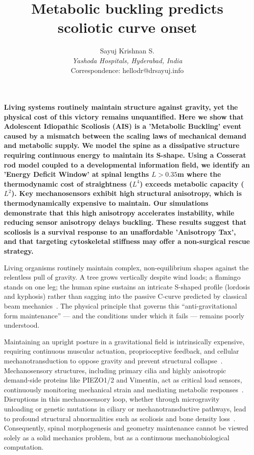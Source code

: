 \documentclass[11pt]{article}
\title{Metabolic buckling predicts scoliotic curve onset}
\author{Sayuj Krishnan S. \\
\textit{Yashoda Hospitals, Hyderabad, India} \\
Correspondence: hellodr@drsayuj.info}
\date{}
\begin{document}
\linenumbers
\maketitle

\textbf{Living systems routinely maintain structure against gravity, yet the physical cost of this victory remains unquantified. Here we show that Adolescent Idiopathic Scoliosis (AIS) is a 'Metabolic Buckling' event caused by a mismatch between the scaling laws of mechanical demand and metabolic supply. We model the spine as a dissipative structure requiring continuous energy to maintain its S-shape. Using a Cosserat rod model coupled to a developmental information field, we identify an 'Energy Deficit Window' at spinal lengths $L > 0.35$m where the thermodynamic cost of straightness ($L^4$) exceeds metabolic capacity ($L^2$). Key mechanosensors exhibit high structural anisotropy, which is thermodynamically expensive to maintain. Our simulations demonstrate that this high anisotropy accelerates instability, while reducing sensor anisotropy delays buckling. These results suggest that scoliosis is a survival response to an unaffordable 'Anisotropy Tax', and that targeting cytoskeletal stiffness may offer a non-surgical rescue strategy.}

\vspace{1em}

Living organisms routinely maintain complex, non-equilibrium shapes against the relentless pull of gravity. A tree grows vertically despite wind loads; a flamingo stands on one leg; the human spine sustains an intricate S-shaped profile (lordosis and kyphosis) rather than sagging into the passive C-curve predicted by classical beam mechanics~\cite{thompson1917growth, goriely2017mathematics, niklas1994plant}. The physical principle that governs this ``anti-gravitational form maintenance'' --- and the conditions under which it fails --- remains poorly understood.

Maintaining an upright posture in a gravitational field is intrinsically expensive, requiring continuous muscular actuation, proprioceptive feedback, and cellular mechanotransduction to oppose gravity and prevent structural collapse~\cite{latimer2005upright, bastien2013unifying, govey2013gravity, proximo2012proprioception}. Mechanosensory structures, including primary cilia and highly anisotropic demand-side proteins like PIEZO1/2 and Vimentin, act as critical load sensors, continuously monitoring mechanical strain and mediating metabolic responses~\cite{Assaraf_2020, Coste_2010, wuest2025vim}. Disruptions in this mechanosensory loop, whether through microgravity unloading or genetic mutations in ciliary or mechanotransductive pathways, lead to profound structural abnormalities such as scoliosis and bone density loss~\cite{lv2023yap, djebar2024astrogliosis, ramli2024piezo1}. Consequently, spinal morphogenesis and geometry maintenance cannot be viewed solely as a solid mechanics problem, but as a continuous mechanobiological computation.
\end{document}
